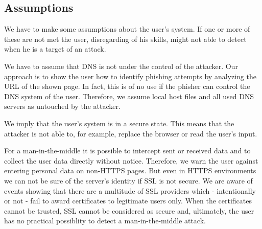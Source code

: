 \subsection{Assumptions}
We have to make some assumptions about the user's system. 
If one or more of these are not met the user, disregarding of his skills, might not able to detect when he is a target of an attack.
\begin{description}[leftmargin=0cm]
	\item[Secure DNS] We have to assume that DNS is not under the control of the attacker.
	Our approach is to show the user how to identify phishing attempts by analyzing the URL of the shown page.
	In fact, this is of no use if the phisher can control the DNS system of the user.
	Therefore, we assume local host files and all used DNS servers as untouched by the attacker.
	\item[Secure Smartphone] We imply that the user's system is in a secure state.
	This means that the attacker is not able to, for example, replace the browser or read the user's input.
	\item[Secure SSL] 
	For a man-in-the-middle it is possible to intercept sent or received data and to collect the user data directly without notice.
	Therefore, we warn the user against entering personal data on non-HTTPS pages.
	But even in HTTPS environments we can not be sure of the server's identity if SSL is not secure.
	We are aware of events showing that there are a multitude of SSL providers which - intentionally or not - fail to award certificates to legitimate users only.
	When the certificates cannot be trusted, SSL cannot be considered as secure and, ultimately, the user has no practical possiblity to detect a man-in-the-middle attack.		
\end{description}

